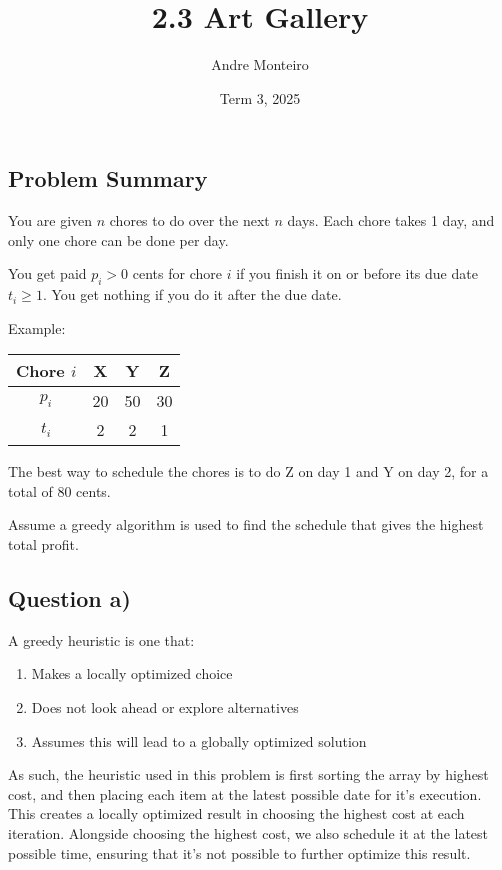 \documentclass[12pt]{article}
\title{2.3 Art Gallery}
\author{Andre Monteiro}
\date{Term 3, 2025}
\begin{document}
\maketitle
\newpage
\subsection*{Problem Summary}
You are given $n$ chores to do over the next $n$ days.  
Each chore takes 1 day, and only one chore can be done per day.  

You get paid $p_i > 0$ cents for chore $i$ if you finish it on or before its due date $t_i \geq 1$.  
You get nothing if you do it after the due date.

Example:

\begin{center}
\begin{tabular}{|c|c|c|c|}
\hline
Chore $i$ & X & Y & Z \\
\hline
$p_i$ & 20 & 50 & 30 \\
$t_i$ & 2 & 2 & 1 \\
\hline
\end{tabular}
\end{center}

The best way to schedule the chores is to do Z on day 1 and Y on day 2, for a total of 80 cents.  

Assume a greedy algorithm is used to find the schedule that gives the highest total profit.

\newpage
\subsection*{Question a)}
A greedy heuristic is one that: 

\begin{enumerate}
    \item Makes a locally optimized choice
    \item Does not look ahead or explore alternatives 
    \item Assumes this will lead to a globally optimized solution
\end{enumerate}

As such, the heuristic used in this problem is first sorting the array by highest cost, and then placing each item at the latest possible date for it's execution. This creates a locally optimized result in choosing the highest cost at each iteration.
Alongside choosing the highest cost, we also schedule it at the latest possible time, ensuring that it's not possible to further optimize this result. \\
\end{document}
